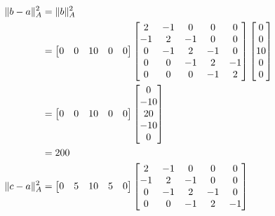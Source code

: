 \documentclass[twoside]{article}
\begin{document}
\begin{align*}
  \|b - a\|^2_A &= \|b\|_A^2 \\
                &=
                  \begin{bmatrix}
                    0 & 0 & 10 & 0 & 0
                  \end{bmatrix}
                  \begin{bmatrix}
                    2 & -1 & 0 & 0 & 0 \\
                    -1 & 2 & -1 & 0 & 0 \\
                    0 & -1 & 2 & -1 & 0 \\
                    0 & 0 & -1 & 2 & -1 \\
                    0 & 0 & 0 & -1 & 2
                  \end{bmatrix}
                  \begin{bmatrix}
                    0 \\
                    0 \\
                    10 \\
                    0 \\
                    0
                  \end{bmatrix} \\
                &=\begin{bmatrix}
                    0 & 0 & 10 & 0 & 0
                  \end{bmatrix}
                  \begin{bmatrix}
                    0 \\
                    -10 \\
                    20 \\
                    -10 \\
                    0
                  \end{bmatrix} \\ \pagebreak[0]
                &= 200 \\
  \|c - a\|^2_A &=
                  \begin{bmatrix}
                    0 & 5 & 10 & 5 & 0
                  \end{bmatrix}
                  \begin{bmatrix}
                    2 & -1 & 0 & 0 & 0 \\
                    -1 & 2 & -1 & 0 & 0 \\
                    0 & -1 & 2 & -1 & 0 \\
                    0 & 0 & -1 & 2 & -1 \\

\end{bmatrix}
\end{align*}
\end{document}

